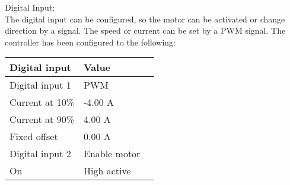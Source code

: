 Digital Input:\\
The digital input can be configured, so the motor can be activated or change direction by a signal. The speed or current can be set by a PWM signal. The controller has been configured to the following:
\begin{table}[H]
	\begin{tabular}{|l|l|p{4.3cm}|}
		\hline%
		\textbf{Digital input}       &  \textbf{Value}         \\
		\hline%
		Digital input 1                                & PWM           \\
		\hline%
		Current at 10\%							  & -4.00 A              \\
		\hline%
		Current at 90\%							  & 4.00 A              \\
		\hline%
		Fixed offset							  & 0.00 A              \\
		\hline%
		Digital input 2                                & Enable motor           \\
		\hline%
		On     &  High active       \\
		\hline%
	\end{tabular}
\end{table}

